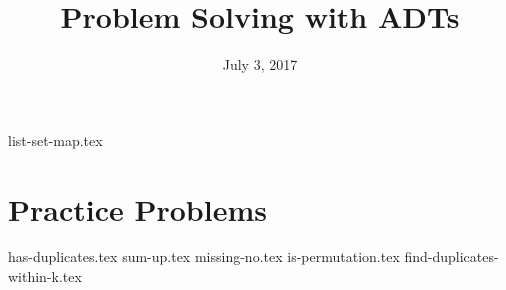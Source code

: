\documentclass{exam}
\title{Problem Solving with ADTs}
\date{July 3, 2017}
\begin{document}
\maketitle

{list-set-map.tex}

\clearpage

\section{Practice Problems}
\begin{questions}
{has-duplicates.tex}
{sum-up.tex}
\clearpage
{missing-no.tex}
{is-permutation.tex}
\clearpage
{find-duplicates-within-k.tex}
\end{questions}
\end{document}
